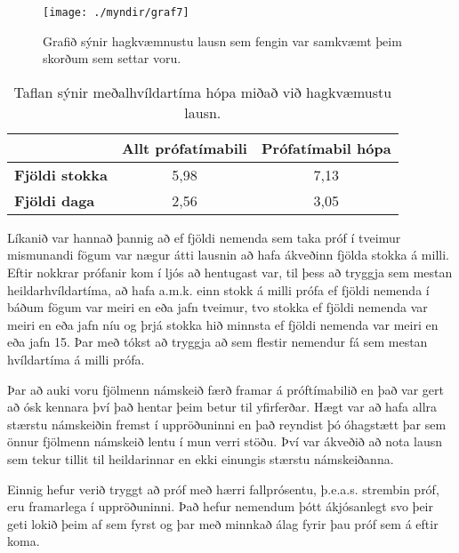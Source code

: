 \documentclass[12pt]{article}
\begin{document}
\begin{figure}[h]
    \centering
    \texttt{[image: ./myndir/graf7]}
    \caption{Grafið sýnir hagkvæmnustu lausn sem fengin var samkvæmt þeim skorðum sem settar voru.}
\end{figure}

\begin{table}[h]
    \centering
    \begin{tabular}{l|c|c|}
        \cline{2-3}
        & \multicolumn{1}{l|}{\textbf{Allt prófatímabili}} & \multicolumn{1}{l|}{\textbf{Prófatímabil hópa}} \\ \hline
        \multicolumn{1}{|l|}{\textbf{Fjöldi stokka}} & 5,98                                             & 7,13                                            \\ \hline
        \multicolumn{1}{|l|}{\textbf{Fjöldi daga}}   & 2,56                                             & 3,05                                            \\ \hline
    \end{tabular}
    \caption{Taflan sýnir meðalhvíldartíma hópa miðað við hagkvæmustu lausn. }
\end{table}

Líkanið var hannað þannig að ef fjöldi nemenda sem taka próf í tveimur mismunandi fögum var nægur átti lausnin að hafa ákveðinn fjölda stokka á milli. Eftir nokkrar prófanir kom í ljós að hentugast var, til þess að tryggja sem mestan heildarhvíldartíma, að hafa a.m.k. einn stokk á milli prófa ef fjöldi nemenda í báðum fögum var meiri en eða jafn tveimur, tvo stokka ef fjöldi nemenda var meiri en eða jafn níu og þrjá stokka hið minnsta ef fjöldi nemenda var meiri en eða jafn 15. Þar með tókst að tryggja að sem flestir nemendur fá sem mestan hvíldartíma á milli prófa. 

\medskip

Þar að auki voru fjölmenn námskeið færð framar á próftímabilið en það var gert
að ósk kennara því það hentar þeim betur til yfirferðar. Hægt var að hafa allra stærstu námskeiðin fremst í uppröðuninni en það reyndist þó óhagstætt þar sem önnur fjölmenn námskeið lentu í mun verri stöðu. Því var ákveðið að nota lausn sem tekur tillit til heildarinnar en ekki einungis stærstu námskeiðanna.
\newpage

Einnig hefur verið tryggt að próf með hærri fallprósentu, þ.e.a.s. strembin próf, eru framarlega í uppröðuninni. Það hefur nemendum þótt ákjósanlegt svo þeir geti lokið þeim af sem fyrst og þar með minnkað álag fyrir þau próf sem á eftir koma. 
\medskip
\end{document}
